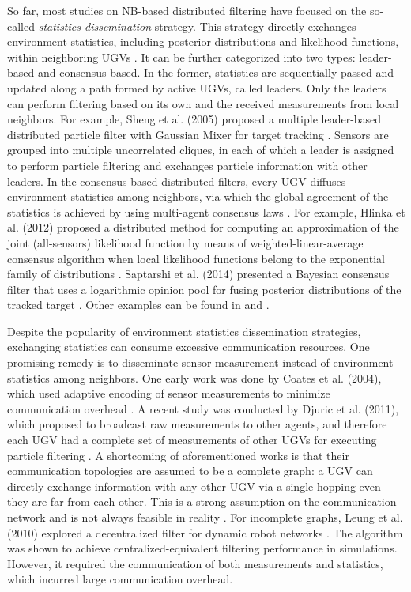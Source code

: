 \documentclass[journal]{IEEEtranTIE}
\theoremstyle{remark}
\begin{document}
	So far, most studies on NB-based distributed filtering have focused on the so-called \textit{statistics dissemination} strategy.
	This strategy directly exchanges environment statistics, including posterior distributions and likelihood functions, within neighboring UGVs \cite{hlinka2013distributed}.
	It can be further categorized into two types: leader-based and consensus-based. 
	In the former, statistics are sequentially passed and updated along a path formed by active UGVs, called leaders.
	Only the leaders can perform filtering based on its own and the received measurements from local neighbors.
	For example, Sheng et al. (2005) proposed a multiple leader-based distributed particle filter with Gaussian Mixer for target tracking \cite{sheng2005distributed}. 
	Sensors are grouped into multiple uncorrelated cliques, in each of which a leader is assigned to perform particle filtering and exchanges particle information with other leaders.
	In the consensus-based distributed filters, every UGV diffuses environment statistics among neighbors, via which the global agreement of the statistics is achieved by using multi-agent consensus laws \cite{olfati2007consensus,ren2005consensus,jadbabaie2003coordination}.
	For example, Hlinka et al. (2012) proposed a distributed method for computing an approximation of the joint (all-sensors) likelihood function by means of weighted-linear-average consensus algorithm when local likelihood functions belong to the exponential family of distributions \cite{hlinka2012likelihood}.
	Saptarshi et al. (2014) presented a Bayesian consensus filter that uses a logarithmic opinion pool for fusing posterior distributions of the tracked target \cite{bandyopadhyay2014distributed}.
	Other examples can be found in \cite{julian2012distributed} and \cite{beaudeau2012target}.
	
	Despite the popularity of environment statistics dissemination strategies, exchanging statistics can consume excessive communication resources.
	One promising remedy is to disseminate sensor measurement instead of environment statistics among neighbors.
	One early work was done by Coates et al. (2004), which used adaptive encoding of sensor measurements to minimize communication overhead \cite{coates2004distributed}.
	A recent study was conducted by Djuric et al. (2011), which proposed to broadcast raw measurements to other agents, and therefore each UGV had a complete set of measurements of other UGVs for executing particle filtering \cite{djuric2011non}.
	A shortcoming of aforementioned works is that their communication topologies are assumed to be a complete graph: 
	a UGV can directly exchange information with any other UGV via a single hopping even they are far from each other. This is a strong assumption on the communication network and is not always feasible in reality \cite{jadbabaie2003coordination,bandyopadhyay2014distributed}.
	For incomplete graphs, Leung et al. (2010) explored a decentralized filter for dynamic robot networks \cite{leung2010decentralized}.
	The algorithm was shown to achieve centralized-equivalent filtering performance in simulations. 
	However, it required the communication of both measurements and statistics, which incurred large communication overhead.
	
\end{document}
